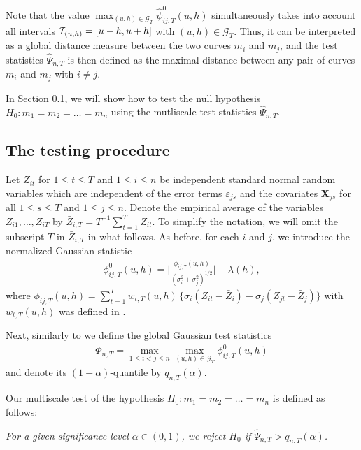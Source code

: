 \documentclass[a4paper,12pt]{article}
\makeatletter
\renewcommand{\eqref}[1]{\tagform@{\ref{#1}}}
\makeatother
\begin{document}
Note that the value $\max_{(u,h) \in \mathcal{G}_T} \hat{\psi}^0_{ij,T}(u, h)$ simultaneously takes into account all intervals $\mathcal{I}_{(u, h)} = [u- h, u+h]$ with $(u,h) \in \mathcal{G}_T$. Thus, it can be interpreted as a global distance measure between the two curves $m_i$ and $m_j$, and the test statistics $\widehat{\Psi}_{n,T}$ is then defined as the maximal distance between any pair of curves $m_i$ and $m_j$ with $i \ne j$.

In Section \ref{subsec:test:test}, we will show how to test the null hypothesis \linebreak $H_0: m_1 =m_2 = \ldots = m_n$ using the mutliscale test statistics $\widehat{\Psi}_{n,T}$.

\subsection{The testing procedure}\label{subsec:test:test}


Let $Z_{it}$ for $1 \le t \le T$ and $1 \le i \le n$ be independent standard normal random variables which are independent of the error terms $\varepsilon_{js}$ and the covariates $\mathbf{X}_{js}$ for all $1 \leq s \leq T $ and $1 \leq j \leq n$. Denote the empirical average of the variables $Z_{i1},\ldots,Z_{iT}$ by $\bar{Z}_{i,T} = T^{-1} \sum_{t=1}^T Z_{it}$. To simplify the notation, we will omit the subscript $T$ in $\bar{Z}_{i,T}$ in what follows. As before, for each $i$ and $j$, we introduce the normalized Gaussian statistic 
\begin{align}\label{eq:test:phi_zero_ij}
\phi^0_{ij,T}(u, h) =  \bigg|\frac{\phi_{ij,T}(u,h)}{(\sigma_i^2 + \sigma_j^2)^{1/2}}\bigg| - \lambda(h),
\end{align}
where $\phi_{ij,T}(u,h) = \sum\nolimits_{t=1}^T w_{t,T}(u,h) \, \big\{ \sigma_i (Z_{it} - \bar{Z}_i) - \sigma_j (Z_{jt} - \bar{Z}_j) \big\}$ with $w_{t, T}(u, h)$ was defined in \eqref{eq:weights}. 

Next, similarly to \eqref{eq:test:psi_hat} we define the global Gaussian test statistics
\begin{align}\label{Phi-statistic}
\Phi_{n,T} = \max_{1 \le i < j \le n}\max_{(u,h) \in \mathcal{G}_T} \phi^0_{ij,T}(u, h)
\end{align}
and denote its $(1-\alpha)$-quantile by $q_{n,T}(\alpha)$.

Our multiscale test of the hypothesis $H_0: m_1 = m_2 = \ldots = m_n$ is defined as follows: 
\begin{center}
\begin{minipage}[c][1.25cm][c]{13cm}
\textit{For a given significance level $\alpha \in (0,1)$, we reject $H_0$ if $\widehat{\Psi}_{n,T} > q_{n,T}(\alpha)$.}
\end{minipage}
\end{center}
\end{document}
